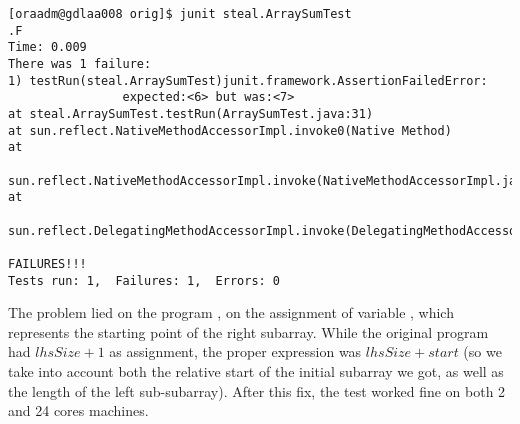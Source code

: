 \begin{verbatim}
[oraadm@gdlaa008 orig]$ junit steal.ArraySumTest
.F
Time: 0.009
There was 1 failure:
1) testRun(steal.ArraySumTest)junit.framework.AssertionFailedError:
                expected:<6> but was:<7>
at steal.ArraySumTest.testRun(ArraySumTest.java:31)
at sun.reflect.NativeMethodAccessorImpl.invoke0(Native Method)
at
                
sun.reflect.NativeMethodAccessorImpl.invoke(NativeMethodAccessorImpl.java:57)
at
                
sun.reflect.DelegatingMethodAccessorImpl.invoke(DelegatingMethodAccessorImpl.java:43)

FAILURES!!!
Tests run: 1,  Failures: 1,  Errors: 0
\end{verbatim}
\hfill

The problem lied on the program , on the assignment
of variable , which represents the starting point of the
right subarray. While the original program had $lhsSize + 1$
as assignment, the proper expression was $lhsSize + start$ (so we take
into account both the relative start of the initial subarray we got,
as well as the length of the left sub-subarray). After this fix, the test
worked fine on both 2 and 24 cores machines.



